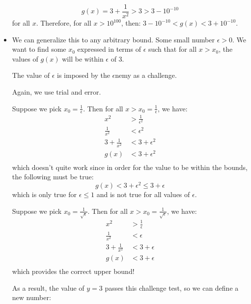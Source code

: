 \begin{itemize}
\begin{equation}
        g(x)=3+\frac{1}{x^2} > 3 > 3-10^{-10}
        \label{eq:}
    \end{equation}
    for all $x$. Therefore, for all $x>10^{100}$, then:
    $3-10^{-10} < g(x) < 3+10^{-10}$.
    \item We can generalize this to any arbitrary bound. Some small number $\epsilon>0$. We want to find some $x_0$ expressed in terms of $\epsilon$ such that for all $x>x_0$, the values of $g(x)$ will be within $\epsilon$ of 3.
    \begin{mnemonic}
        The value of $\epsilon$ is imposed by the $\epsilon$nemy as a challenge.
    \end{mnemonic}
    Again, we use trial and error.
    \begin{example}
        Suppose we pick $x_0=\frac{1}{\epsilon}$. Then for all $x>x_0=\frac{1}{\epsilon}$, we have:
        \begin{align}
            x^2 &> \frac{1}{\epsilon^2} \\
            \frac{1}{x^2} &< \epsilon^2 \\ 
            3+\frac{1}{x^2} &< 3+\epsilon^2 \\ 
            g(x) &< 3+\epsilon^2 \\
        \end{align}
        which doesn't quite work since in order for the value to be within the bounds, the following must be true:
        \begin{equation}
            g(x) < 3+\epsilon^2 \le 3+ \epsilon
            \label{eq:}
        \end{equation}
        which is only true for $\epsilon \le 1$ and is not true for all values of $\epsilon$.
    \end{example}
    \begin{example}
        Suppose we pick $x_0=\frac{1}{\sqrt{\epsilon}}$. Then for all $x>x_0=\frac{1}{\sqrt\epsilon}$, we have:
        \begin{align}
            x^2 &> \frac{1}{\epsilon} \\
            \frac{1}{x^2} &< \epsilon \\ 
            3+\frac{1}{x^2} &< 3+\epsilon \\ 
            g(x) &< 3+\epsilon \\
        \end{align}
        which provides the correct upper bound!
    \end{example}
    As a result, the value of $y=3$ passes this challenge test, so we can define a new number:

\end{itemize}
